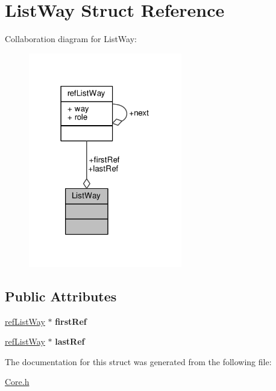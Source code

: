 \hypertarget{structListWay}{\section{List\-Way Struct Reference}
\label{structListWay}
}


Collaboration diagram for List\-Way\-:
\nopagebreak
\begin{figure}[H]
\begin{center}
\leavevmode
\includegraphics[width=190pt]{structListWay__coll__graph}
\end{center}
\end{figure}
\subsection*{Public Attributes}
\begin{DoxyCompactItemize}
\item 
\hypertarget{structListWay_a5864089678f85dee9cac7dcbb651c760}{\hyperlink{structrefListWay}{ref\-List\-Way} $\ast$ {\bfseries first\-Ref}}\label{structListWay_a5864089678f85dee9cac7dcbb651c760}

\item 
\hypertarget{structListWay_af314caeee839f16f5b489a0ec34cba44}{\hyperlink{structrefListWay}{ref\-List\-Way} $\ast$ {\bfseries last\-Ref}}\label{structListWay_af314caeee839f16f5b489a0ec34cba44}

\end{DoxyCompactItemize}


The documentation for this struct was generated from the following file\-:\begin{DoxyCompactItemize}
\item 
\hyperlink{Core_8h}{Core.\-h}\end{DoxyCompactItemize}
